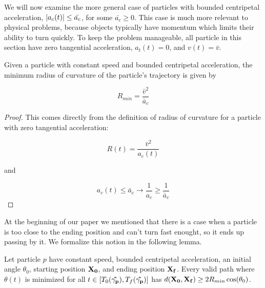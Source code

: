 We will now examine the more general case of particles with bounded centripetal acceleration, $\abs{a_c(t)} \le \bar{a_c}$, for some $\bar{a_c} \ge 0$. This case is much more relevant to physical problems, because objects typically have momentum which limits their ability to turn quickly. To keep the problem manageable, all particle in this section have zero tangential acceleration, $a_t(t) = 0$, and $v(t) = \bar{v}$.

\begin{lemma} \label{lem:r-curve}
  Given a particle with constant speed and bounded centripetal acceleration, the minimum radius of curvature of the particle's trajectory is given by

  \begin{equation}
    R_{min} = \frac{\bar{v}^2}{\bar{a}_c}
  \end{equation}
  \end{lemma}

\begin{proof}

This comes directly from the definition of radius of curvature for a particle with zero tangential acceleration:

\[
  R(t) = \frac{\bar{v}^2}{a_c(t)}
\]

and 

\[
  a_c(t) \le \bar{a}_c \to \frac{1}{a_c} \ge \frac{1}{\bar{a}_c}
\]
\end{proof}

At the beginning of our paper we mentioned that there is a case when a particle is too close to the ending position and can't turn fast enought, so it ends up passing by it. We formalize this notion in the following lemma.

\begin{lemma}\label{lem:too-close}
  Let particle $p$ have constant speed, bounded centripetal acceleration, an initial angle $\theta_0$, starting position $\mathbf{X_0}$, and ending position $\mathbf{X_f}$. Every valid path where $\theta(t)$ is minimized for all $t \in [T_0(\mathbf{\hat{\gamma_p}}), T_f(\mathbf{\hat{\gamma_p}})]$ has $d(\bvec{X_0}, \bvec{X_f}) \ge 2 R_{min} \cos\paren{\theta_0}$.
\end{lemma}

